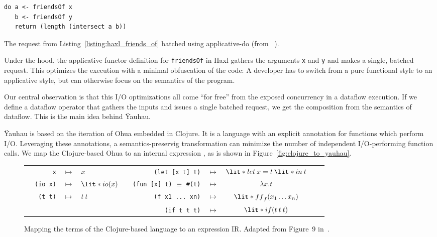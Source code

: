 \begin{listing}
\begin{verbatim}
do a <- friendsOf x
   b <- friendsOf y
   return (length (intersect a b))
\end{verbatim}
\caption{The request from Listing~\ref{listing:haxl_friends_of} batched using applicative-do (from ~\cite{marlow2014haxl}).}
\label{listing:haxl_applicative_do}
\end{listing}

Under the hood, the applicative functor definition for \texttt{friendsOf} in Haxl gathers the arguments \texttt{x} and \texttt{y} and makes a single, batched request.
This optimizes the execution with a minimal obfuscation of the code:
A developer has to switch from a pure functional style to an applicative style, but can otherwise focus on the semantics of the program.

Our central observation is that this \ac{I/O} optimizations all come ``for free'' from the exposed concurrency in a dataflow execution. 
If we define a dataflow operator that gathers the inputs and issues a single batched request, we get the composition from the semantics of dataflow.
This is the main idea behind \"{Y}auhau.


\"{Y}auhau is based on the iteration of Ohua embedded in Clojure.
It is a language with an explicit annotation for functions which perform \ac{I/O}.
Leveraging these annotations, a semantics-preservig transformation can minimize the number of independent \ac{I/O}-performing function calls.
We map the Clojure-based Ohua to an internal expression , as is shown in Figure~\ref{fig:clojure_to_yauhau}.

\begin{figure}[h]
	\centering
	\begin{tabular}{r r c l r r r c l r}
		&\texttt{x} & $\mapsto$ & $x$ &  &\texttt{(let [x t] t)} & $\mapsto$ & $\lit*{let} \: x = t \: \lit*{in} \: t$ &  \\

	&\texttt{(io x)}&$\mapsto$& $\lit*{io}(x)$ & &\texttt{(fun [x] t)} $\equiv$ \texttt{#(t)} & $\mapsto$ & $\lambda x.t$ &\\ 
	&\texttt{(t t)} & $\mapsto$ & $t \: t$ &	 &\texttt{(f x1 ... xn)} & $\mapsto$ & $\lit*{ff}_f(x_1 \ldots x_n)$ & \\
    & & & & &	\texttt{(if t t t)} & $\mapsto$ & $\lit*{if}(t \: t \: t)$  	%
	\end{tabular}
	
	\caption{Mapping the terms of the Clojure-based language to an expression \acs{IR}. Adapted from Figure~9 in~\cite{ertel_cc18}.}
	\label{fig:clojure_to_yauau}
\end{figure}

